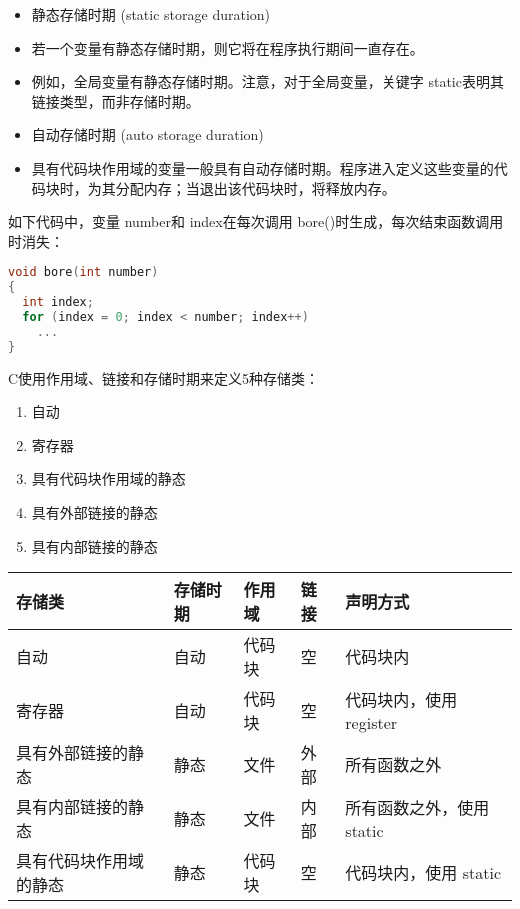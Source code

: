 \begin{frame}[fragile]
  \begin{itemize}
  \item 静态存储时期{ (static storage duration)} \\[0.05in]
  \item[] 若一个变量有静态存储时期，则它将在程序执行期间一直存在。\\[0.05in]
  \item[] 例如，全局变量有静态存储时期。注意，对于全局变量，关键字{ static}表明其链接类型，而非存储时期。\\[0.1in]
  \item 自动存储时期{ (auto storage duration)}\\[0.05in]
  \item[] 具有代码块作用域的变量一般具有自动存储时期。程序进入定义这些变量的代码块时，为其分配内存；当退出该代码块时，将释放内存。
  \end{itemize}
\end{frame}

\begin{frame}[fragile]\ft{\secname}
  如下代码中，变量{ number}和{ index}在每次调用{ bore()}时生成，每次结束函数调用时消失：
  \begin{lstlisting}[language=c,frame=single]
void bore(int number)
{
  int index;
  for (index = 0; index < number; index++)
    ...
}    
  \end{lstlisting}
\end{frame}

\begin{frame}[fragile]\ft{\secname}
C使用作用域、链接和存储时期来定义5种存储类：
\begin{enumerate}
\item 自动
\item 寄存器
\item 具有代码块作用域的静态
\item 具有外部链接的静态
\item 具有内部链接的静态
\end{enumerate}
\end{frame}

\begin{frame}[fragile]\ft{\secname}
  \begin{table}
    \centering
    \begin{tabular}{p{3cm}|p{1cm}|p{1.5cm}|p{1cm}|p{3cm}}\hline
      存储类&存储时期&作用域&链接&声明方式\\\hline\hline
      自动&自动&代码块&空&代码块内\\\hline
      寄存器&自动&代码块&空&代码块内，使用{ register}\\\hline
      具有外部链接的静态&静态&文件&外部&所有函数之外\\\hline
      具有内部链接的静态&静态&文件&内部&所有函数之外，使用{ static}\\\hline
      具有代码块作用域的静态&静态&代码块&空&代码块内，使用{ static}\\\hline
    \end{tabular}
    
  \end{table}
\end{frame}

